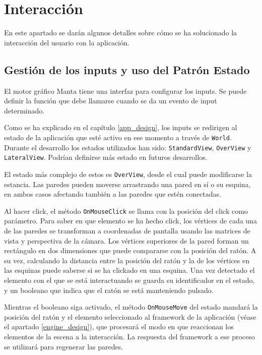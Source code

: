 \clearpage
\section{Interacción}
En este apartado se darán algunos detalles sobre cómo se ha solucionado la interacción del usuario con la aplicación.

\subsection{Gestión de los inputs y uso del Patrón Estado}
El motor gráfico Manta tiene una interfaz para configurar los inputs. Se puede definir la función que debe llamarse cuando se da un evento de input determinado.

Como se ha explicado en el capítulo \ref{app_design}, los inputs se redirigen al estado de la aplicación que esté activo en ese momento a través de \texttt{World}. Durante el desarrollo los estados utilizados han sido: \texttt{StandardView}, \texttt{OverView} y \texttt{LateralView}. Podrían definirse más estado en futuros desarrollos.

El estado más complejo de estos es \texttt{OverView}, desde el cual puede modificarse la estancia. Las paredes pueden moverse arrastrando una pared en sí o su esquina, en ambos casos afectando también a las paredes que estén conectadas.

Al hacer click, el método \texttt{OnMouseClick} se llama con la posición del click como parámetro. Para saber en que elemento se ha hecho click, los vértices de cada una de las paredes se transforman a coordenadas de pantalla usando las matrices de vista y perspectiva de la cámara. Los vértices superiores de la pared forman un rectángulo en dos dimensiones que puede compararse con la posición del ratón. A su vez, calculando la distancia entre la posición del ratón y la de los vértices en las esquinas puede saberse si se ha clickado en una esquina. Una vez detectado el elemento con el que se está interactuando se guarda su identificador en el estado, y un booleano que indica que el ratón se está manteniendo pulsado.

Mientras el booleano siga activado, el método \texttt{OnMouseMove} del estado mandará la posición del ratón y el elemento seleccionado al framework de la aplicación (véase el apartado \ref{engine_design}), que procesará el modo en que reaccionan los elementos de la escena a la interacción. La respuesta del framework a ese proceso se utilizará para regenerar las paredes.

